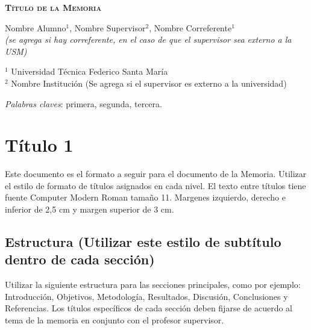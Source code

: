 \documentclass[11pt,letterpaper]{article}
\begin{document}
\clearpage



\begin{center}
    \textsc{\textbf{\LARGE Título de la Memoria}}\\
        
    \vspace{10mm}    
        
    Nombre Alumno$^1$, Nombre Supervisor$^2$, Nombre Correferente$^1$\\
    \emph{(se agrega si hay correferente, en el caso de que el supervisor sea externo a la USM)}\\
    
    \vspace{5mm}
    
    $^1$ Universidad Técnica Federico Santa María\\
    $^2$ Nombre Institución (Se agrega si el supervisor es externo a la universidad)

    \vspace{5mm}
    
\end{center}

\begin{abstract}
    (Incluir resumen de máximo 250 palabras).
    \lipsum[1]
\end{abstract}

\noindent \emph{Palabras claves}: primera, segunda, tercera.

\section{Título 1}
Este documento es el formato a seguir para el documento de la Memoria. Utilizar el estilo de formato de títulos asignados en cada nivel. El texto entre títulos tiene fuente Computer Modern Roman tamaño 11. Margenes izquierdo, derecho e inferior de 2,5 cm y margen superior de 3 cm.


\subsection{Estructura (Utilizar este estilo de subtítulo dentro de cada sección)}
Utilizar la siguiente estructura para las secciones principales, como por ejemplo: Introducción, Objetivos, Metodología, Resultados, Discusión, Conclusiones y Referencias. Los títulos específicos de cada sección deben fijarse de acuerdo al tema de la memoria en conjunto con el profesor supervisor.\\
\end{document}
